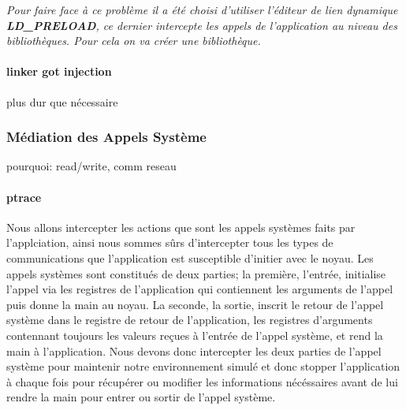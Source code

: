 \textit{Pour faire face à ce problème il a été choisi d'utiliser l'éditeur de
  lien dynamique \textbf{LD\_PRELOAD}, ce dernier intercepte les appels de
  l'application au niveau des bibliothèques. Pour cela on va créer une
  bibliothèque.}

\paragraph{linker got injection}
plus dur que nécessaire

\subsubsection{Médiation des Appels Système}
pourquoi: read/write, comm reseau

\paragraph{ptrace}
Nous allons intercepter les actions que sont les appels systèmes faits par
l'applciation, ainsi nous sommes sûrs d'intercepter tous les types de
communications que l'application est susceptible d'initier avec le noyau. Les
appels systèmes sont constitués de deux parties; la première, l'entrée,
initialise l'appel via les registres de l'application qui contiennent les
arguments de l'appel puis donne la main au noyau. La seconde, la sortie, inscrit
le retour de l'appel système dans le registre de retour de l'application, les
registres d'arguments contennant toujours les valeurs reçues à l'entrée de
l'appel système, et rend la main à l'application. Nous devons donc intercepter
les deux parties de l'appel système pour maintenir notre environnement simulé et
donc stopper l'application à chaque fois pour récupérer ou modifier les
informations nécéssaires avant de lui rendre la main pour entrer ou sortir de
l'appel système.

